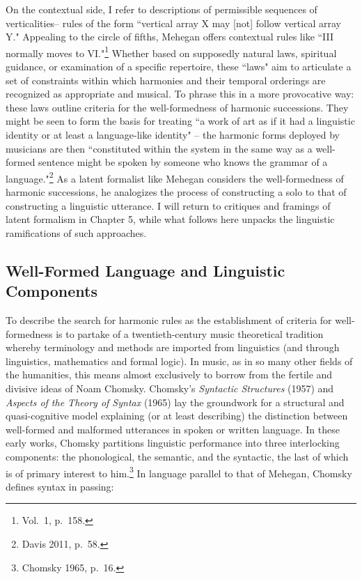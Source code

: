 On the contextual side, I refer to descriptions of permissible sequences of verticalities-- rules of the form ``vertical array X may [not] follow vertical array Y."  Appealing to the circle of fifths, Mehegan offers contextual rules like ``III normally moves to VI."\footnote{Vol.\ 1, p.\ 158.}  Whether based on supposedly natural laws, spiritual guidance, or examination of a specific repertoire, these ``laws" aim to articulate a set of constraints within which harmonies and their temporal orderings are recognized as appropriate and musical.  To phrase this in a more provocative way: these laws outline criteria for the well-formedness of harmonic successions.  They might be seen to form the basis for treating ``a work of art as if it had a linguistic identity or at least a language-like identity" -- the harmonic forms deployed by musicians are then ``constituted within the system in the same way as a well-formed sentence might be spoken by someone who knows the grammar of a language."\footnote{Davis 2011, p.\ 58.}  As a latent formalist like Mehegan considers the well-formedness of harmonic successions, he analogizes the process of constructing a solo to that of constructing a linguistic utterance.  I will return to critiques and framings of latent formalism in Chapter 5, while what follows here unpacks the linguistic ramifications of such approaches.

\subsection{Well-Formed Language and Linguistic Components}

To describe the search for harmonic rules as the establishment of criteria for well-formedness is to partake of a twentieth-century music theoretical tradition whereby terminology and methods are imported from linguistics (and through linguistics, mathematics and formal logic).  In music, as in so many other fields of the humanities, this means almost exclusively to borrow from the fertile and divisive ideas of Noam Chomsky.  Chomsky's \emph{Syntactic Structures} (1957) and \emph{Aspects of the Theory of Syntax} (1965) lay the groundwork for a structural and quasi-cognitive model explaining (or at least describing) the distinction between well-formed and malformed utterances in spoken or written language.  In these early works, Chomsky partitions linguistic performance into three interlocking components: the phonological, the semantic, and the syntactic, the last of which is of primary interest to him.\footnote{Chomsky 1965, p.\ 16.}  In language parallel to that of Mehegan, Chomsky defines syntax in passing:

